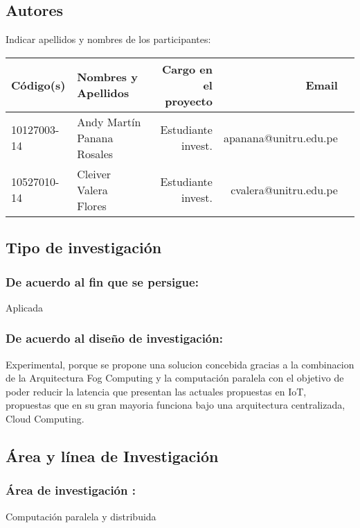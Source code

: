 \subsection{Autores}
Indicar apellidos y nombres de los participantes:
\begin{center}
    \begin{table}[!ht]
    \centering
        \begin{tabular}{llrrr} \toprule
        {\bf Código(s)} & {\bf Nombres y Apellidos} & {\bf Cargo en el proyecto} & {\bf Email} \\ \midrule
        10127003-14 & Andy Martín Panana Rosales & Estudiante invest. & apanana@unitru.edu.pe           \\
        10527010-14    & Cleiver Valera Flores & Estudiante invest. & cvalera@unitru.edu.pe            \\ \bottomrule
        \end{tabular}
    \end{table}
\end{center}

\subsection{Tipo de investigación}
    \subsubsection{De acuerdo al fin que se persigue:} 
    Aplicada
                    
    \subsubsection{De acuerdo al diseño de investigación:} 
    Experimental, porque se propone una solucion concebida gracias a la combinacion de la Arquitectura Fog Computing y la computación paralela con el objetivo de poder reducir la latencia que presentan las actuales propuestas en IoT, propuestas que en su gran mayoria funciona bajo una arquitectura centralizada, Cloud Computing.
\subsection{Área y línea de Investigación}
    \subsubsection{Área de investigación :} 
    Computación paralela y distribuida
    
